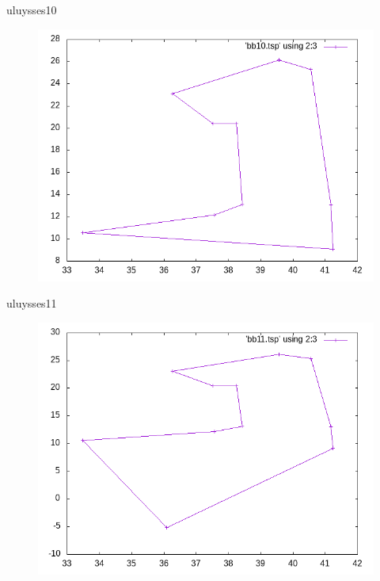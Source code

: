\documentclass{beamer}
\begin{document}
\begin{frame}[fragile]{uluysses10}
\begin{figure}[H]
\centering
\includegraphics[scale=0.5]{bb10.png}
\end{figure}
\end{frame}

\begin{frame}[fragile]{uluysses11}
\begin{figure}[H]
\centering
\includegraphics[scale=0.5]{bb11.png}
\end{figure}
\end{frame}
\end{document}
